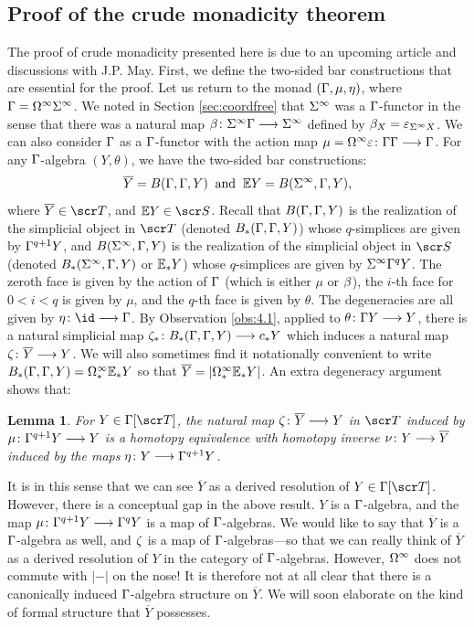 \documentclass{amsart}
\newtheorem{lem}[thm]{Lemma}
\theoremstyle{definition}
\begin{document}
\subsection{Proof of the crude monadicity theorem}
The proof of crude monadicity presented here is due to an upcoming article \cite{KMZ25} and discussions with J.P. May. First, we define the two-sided bar constructions that are essential for the proof. 
Let us return to the monad $(\Gamma, \mu, \eta)$, where $\Gamma = \Omega^{\infty}\Sigma^{\infty}$. We noted in Section \ref{sec:coordfree} that $\Sigma^{\infty}$ was a $\Gamma$-functor in the sense that there was a natural map $\beta \colon \Sigma^{\infty} \Gamma \longrightarrow \Sigma^{\infty}$ defined by $\beta_X = \varepsilon_{\Sigma^{\infty}X}$.
We can also consider $\Gamma$ as a $\Gamma$-functor with the action map $\mu = \Omega^{\infty}\varepsilon \colon \Gamma \Gamma \longrightarrow \Gamma$. For any $\Gamma$-algebra $(Y,\theta)$, we have the two-sided bar constructions:
\[\overline{Y} = B(\Gamma,\Gamma,Y) \; \; \textrm{and} \; \; \mathbb{E} Y = B(\Sigma^{\infty},\Gamma,Y),\]
where $\overline{Y} \in \sT$, and $\bE Y \in \sS$. Recall that $B(\Gamma,\Gamma,Y)$ is the realization of the simplicial object in $\sT$ (denoted $B_*(\Gamma,\Gamma,Y)$) whose $q$-simplices are given by $\Gamma^{q+1}Y$, and $B(\Sigma^{\infty},\Gamma,Y)$ is the realization of the simplicial object in $\sS$ (denoted $B_*(\Sigma^{\infty},\Gamma,Y)$ or $\mathbb{E}_* Y$) 
whose $q$-simplices are given by $\Sigma^{\infty}\Gamma^qY$. The zeroth face is given by the action of $\Gamma$ (which is either $\mu$ or $\beta$), the $i$-th face for $0 < i < q$ is given by $\mu$, and the $q$-th face is given by $\theta$. The degeneracies are all given by $\et \colon \id \rtarr \GA$. By Observation \ref{obs:4.1}, applied to $\theta \colon \Gamma Y \longrightarrow Y$, there is a natural simplicial map $\zeta_* \colon B_{*}(\Gamma,\Gamma,Y) \longrightarrow c_* Y$ which 
induces a natural map $\zeta \colon \overline{Y} \longrightarrow Y$. We will also sometimes find it notationally convenient to write $B_*(\Gamma,\Gamma,Y) = \Omega^{\infty}_* \mathbb{E}_* Y$ so that $\overline{Y} = |\Omega^{\infty}_* \mathbb{E}_* Y|$.
An extra degeneracy argument shows that:
\begin{lem}\label{lem:4.1}
For $Y \in \GA[\sT]$, the natural map $\zeta \colon \overline{Y} \longrightarrow Y$ in $\sT$ induced by $\mu \colon \Gamma^{q+1} Y \longrightarrow Y$ is a homotopy equivalence with homotopy inverse $\nu \colon Y \longrightarrow \overline{Y}$ induced by the maps $\eta \colon Y \longrightarrow \Gamma^{q+1}Y$.
\end{lem}
It is in this sense that we can see $\overline{Y}$ as a derived resolution of $Y \in \GA[\sT]$. However, there is a conceptual gap in the above result. $Y$ is a $\Gamma$-algebra, and the map $\mu \colon \Gamma^{q+1} Y \longrightarrow \Gamma^q Y$ is a map of $\Gamma$-algebras.
We would like to say that $\overline{Y}$ is a $\Gamma$-algebra as well, and $\zeta$ is a map of $\Gamma$-algebras---so that we can really think of $\overline{Y}$ as a derived resolution of $Y$ in the category of $\Gamma$-algebras. However, $\Omega^{\infty}$ does not commute with $|-|$ on the nose!
It is therefore not at all clear that there is a canonically induced $\Gamma$-algebra structure on $\overline{Y}$. We will soon elaborate on the kind of formal structure that $\overline{Y}$ possesses. 
\end{document}
